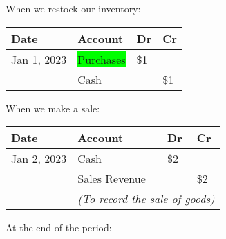 \begin{tcolorbox}[colframe=black,colback=white,title=Example to compare the two inventory systems]
\begin{minipage}[t]{0.48\textwidth}
        \vspace{1.3em}

        When we restock our inventory:

        \begin{tabular}{llll}
            \textbf{Date} & \textbf{Account}           & \textbf{Dr} & \textbf{Cr} \\
            \hline
            Jan 1, 2023   & \colorbox{lime}{Purchases} & \$1         &             \\
                          & \quad Cash                 &             & \$1         \\
        \end{tabular}

        \vspace{1.3em}

        When we make a sale:

        \begin{tabular}{llll}
            \textbf{Date} & \textbf{Account}                                           & \textbf{Dr} & \textbf{Cr} \\
            \hline
            Jan 2, 2023   & Cash                                                       & \$2         &             \\
                          & \quad Sales Revenue                                        &             & \$2         \\
                          & \multicolumn{3}{l}{\textit{(To record the sale of goods)}}                             \\
        \end{tabular}

        \vspace{1.3em}

        At the end of the period:


\end{minipage}
\end{tcolorbox}
